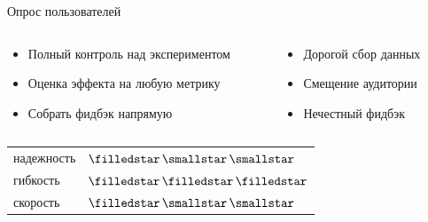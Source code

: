 \documentclass[11pt,aspectratio=169,handout]{beamer}
\begin{document}
\begin{frame}{Опрос пользователей}

\begin{columns}
\begin{column}{0.47\textwidth}
   \begin{tcolorbox}[colback=info!5,colframe=info!80,title=Плюсы]
      \begin{itemize}
      \item Полный контроль над экспериментом
      \item Оценка эффекта на любую метрику
      \item Собрать фидбэк напрямую
      \end{itemize}
    \end{tcolorbox}
\end{column}
\begin{column}{0.47\textwidth}
    \begin{tcolorbox}[colback=warn!5,colframe=warn!80,title=Минусы]
      \begin{itemize}
       \item Дорогой сбор данных
       \item Смещение аудитории
       \item Нечестный фидбэк
      \end{itemize}
    \end{tcolorbox}
\end{column}
\end{columns}

\pause
\vfill

\begin{large}
\begin{tabular}{ll}
надежность & \color{red}$\filledstar\,\smallstar\,\smallstar$ \\
гибкость & \color{red}$\filledstar\,\filledstar\,\filledstar$ \\
скорость & \color{red}$\filledstar\,\smallstar\,\smallstar$ \\
\end{tabular}
\end{large}

\end{frame}
\end{document}
